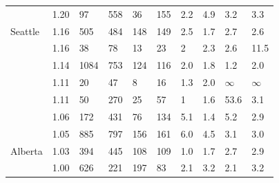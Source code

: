 \documentclass[utf8]{FrontiersinHarvard} %
\begin{document}
\begin{table}[h!]
\begin{ssmall}
\begin{tabular}{llllllllll}
			\cite{Stecher:2018aa}            & 1.20      & 97                                   & 558                                     & 36                           & 155                                        & 2.2       & 4.9       & 3.2       & 3.3       \\
			\cite{chato_public_2020} Seattle & 1.16      & 505                                  & 484                                     & 148                          & 149                                        & 2.5       & 1.7       & 2.7       & 2.6       \\
			\cite{Billings:2019aa}           & 1.16      & 38                                   & 78                                      & 13                           & 23                                         & 2         & 2.3       & 2.6       & 11.5      \\
			\cite{Yan:2021aa}                & 1.14      & 1084                                 & 753                                     & 124                          & 116                                        & 2.0       & 1.8       & 1.2       & 2.0       \\
			\cite{Chen:2023aa}               & 1.11      & 20                                   & 47                                      & 8                            & 16                                         & 1.3       & 2.0       & $\infty$  & $\infty$  \\
			\cite{Leal:2020aa}               & 1.11      & 50                                   & 270                                     & 25                           & 57                                         & 1         & 1.6       & 53.6      & 3.1       \\
			\cite{Perez-Losada:2017aa}       & 1.06      & 172                                  & 431                                     & 76                           & 134                                        & 5.1       & 1.4       & 5.2       & 2.9       \\
			\cite{liu_dynamics_2020}         & 1.05      & 885                                  & 797                                     & 156                          & 161                                        & 6.0       & 4.5       & 3.1       & 3.0       \\ %
			\cite{chato_public_2020} Alberta & 1.03      & 394                                  & 445                                     & 108                          & 109                                        & 1.0       & 1.7       & 2.7       & 2.9       \\
			\cite{Fabeni:2020aa}             & 1.00      & 626                                  & 221                                     & 197                          & 83                                         & 2.1       & 3.2       & 2.1       & 3.2       \\

			\hline
		\end{tabular}
	\end{ssmall}
\end{table}
\end{document}
